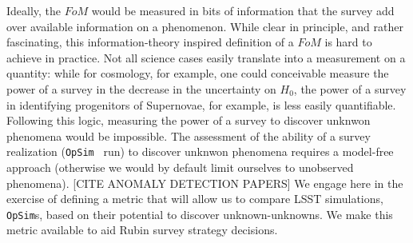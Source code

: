 \documentclass[onecolumn, 10pt]{aastex63}
\newcommand{\new}[1]{{\color{blue} #1}}
\newcommand{\question}[1]{{\color{red} #1}}
\newcommand{\opsim}{\texttt{OpSim}}
\begin{document}

Ideally, the $FoM$ would be measured in bits of information that the survey add over available information on a phenomenon. While clear in principle, and rather fascinating, this information-theory inspired definition of a $FoM$ is hard to achieve in practice. Not all science cases easily translate into a measurement on a quantity: while for cosmology, for example, one could conceivable measure the power of a survey in the decrease in the uncertainty on $H_0$, the power of a survey in identifying progenitors of Supernovae, for example, is less easily quantifiable.  Following this logic, measuring the power of a survey to discover unknwon phenomena would be impossible.
The assessment of the ability of a survey realization (\opsim~ run) to discover unknwon phenomena requires a model-free approach (otherwise we would by default limit ourselves to unobserved phenomena). \question{[CITE ANOMALY DETECTION PAPERS]}
We engage here in the exercise of defining a metric that will allow us to compare LSST simulations, \opsim s, based on their potential to discover unknown-unknowns. We make this metric available to aid Rubin survey strategy decisions.
\end{document}
